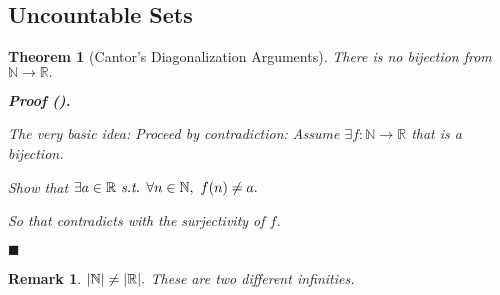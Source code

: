 \documentclass[12pt,a4paper]{article}
\newtheorem{thm}{Theorem}[subsection]
\newcounter{nprf}[subsection]
\newtheorem*{rmk}{\indent Remark}
\newenvironment*{prf}{\par\indent\textbf{\textit{Proof} (\stepcounter{nprf}\thenprf). }\par }{\par\hfill $\blacksquare$\par}
\def\R{{\mathbb{R}}}
\def\N{{\mathbb{N}}}
\def\st{\emph{ s.t. }}
\begin{document}
\subsection{Uncountable Sets}
\begin{framed}
\begin{thm}[Cantor's Diagonalization Arguments]\label{thm6.2.1}
	There is no bijection from $\N\to\R.$
	\begin{prf}
		The very basic idea: Proceed by contradiction: Assume $\exists f:\N\to\R$ that is a bijection.\par Show that $\exists a\in\R\st\forall n\in\N,\ f(n)\neq a.$\par So that contradicts with the surjectivity of $f$.
	\end{prf}
\end{thm}
\begin{rmk}
$\qty|\N|\neq\qty|\R|.$ These are two different infinities. 	
\end{rmk}
\end{framed}
\end{document}
